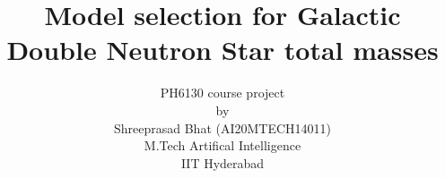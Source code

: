 \documentclass[journal,12pt,twocolumn]{IEEEtran}
\begin{document}
\makeatletter
{}
\makeatother
\let\StandardTheFigure\thefigure
\let\vec\mathbf
\def\putbox#1#2#3{\makebox[0in][l]{\makebox[#1][l]{}\raisebox{\baselineskip}[0in][0in]{\raisebox{#2}[0in][0in]{#3}}}}
     \def\rightbox#1{\makebox[0in][r]{#1}}
     \def\centbox#1{\makebox[0in]{#1}}
     \def\topbox#1{\raisebox{-\baselineskip}[0in][0in]{#1}}
     \def\midbox#1{\raisebox{-0.5\baselineskip}[0in][0in]{#1}}
\vspace{3cm}
\title{Model selection for Galactic Double Neutron Star total masses}
\author{PH6130 course project\\by\\Shreeprasad Bhat (AI20MTECH14011)\\M.Tech Artifical Intelligence\\IIT Hyderabad}
%
%
%
% 
%
\end{document}
